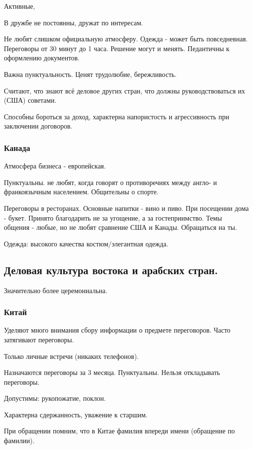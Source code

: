 Активные, \missed{}

В дружбе не постоянны, дружат по интересам.

Не любят слишком официальную атмосферу. Одежда - может быть повседневная. Переговоры от 30 минут до 1 часа. Решение могут и менять. Педантичны к оформлению документов.

Важна пунктуальность. Ценят трудолюбие, бережливость.

Считают, что знают всё деловое \missed{} других стран, что должны руководствоваться их (США) советами.

Способны бороться за доход, характерна напористость и агрессивность при заключении договоров.

\subsubsection{Канада}

Атмосфера бизнеса - европейская.

Пунктуальны. не любят, когда говорят о противоречиях между англо- и франкоязычным населением. Общительны о спорте.

Переговоры в ресторанах. Основные напитки - вино и пиво. При посещении дома - букет. Принято благодарить не за угощение, а за гостеприимство. Темы общения - любые, но не любят сравнение США и Канады. Обращаться на ты.

Одежда: высокого качества костюм/элегантная одежда.

\subsection{Деловая культура востока и арабских стран.}

Значительно более церемониальна.

\subsubsection{Китай}

Уделяют много внимания сбору информации о предмете переговоров. Часто затягивают переговоры.

Только личные встречи (никаких телефонов).

Назначаются переговоры за 3 месяца. Пунктуальны. Нельзя откладывать переговоры.

Допустимы: рукопожатие, поклон.

Характерна сдержанность, уважение к старшим.

При обращении помним, что в Китае фамилия впереди имени (обращение по фамилии).

